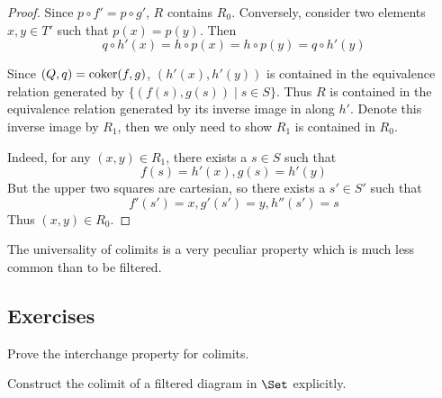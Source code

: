 \begin{proof}
    Since $p\circ f' = p\circ g'$, $R$ contains $R_0$.
    Conversely, consider two elements $x,y\in T'$ such that $p(x)=p(y)$. Then
    \begin{equation*}
      q\circ h' (x) = h\circ p (x) = h\circ p (y) = q\circ h'(y)
    \end{equation*}

    Since $(Q,q)=\operatorname{coker}(f,g)$, $(h' (x),h' (y))$ is contained in the equivalence relation generated by $\{(f(s),g(s))\mid s\in S\}$.
    Thus $R$ is contained in the equivalence relation generated by its inverse image in along $h'$. Denote this inverse image by $R_1$, then we only need to show $R_1$ is contained in $R_0$.

    Indeed, for any $(x,y)\in R_1$, there exists a $s\in S$ such that
    \begin{equation*}
      f(s)=h' (x),g(s)=h' (y)
    \end{equation*}
    But the upper two squares are cartesian, so there exists a $s'\in S'$ such that
    \begin{equation*}
      f'(s')=x,g'(s')=y,h''(s')=s
    \end{equation*}
    Thus $(x,y)\in R_0$.
  \end{proof}
  The universality of colimits is a very peculiar property which is much less common than to be filtered.

\subsection{Exercises}
  \begin{ex}
    Prove the interchange property for colimits.
  \end{ex}
  \begin{ex}
    Construct the colimit of a filtered diagram in $\Set$ explicitly.
  \end{ex}


